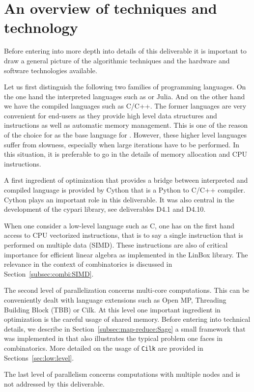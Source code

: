 \documentclass{deliverablereport}
\newcommand{\Cilk}{\texttt{Cilk}\xspace}
\begin{document}
\section{An overview of techniques and technology}

Before entering into more depth into details of this deliverable it is
important to draw a general picture of the algorithmic techniques
and the hardware and software technologies available.

Let us first distinguish the following two families of programming
languages. On the one hand the interpreted languages
such as \Python or Julia. And on the other hand we have the compiled languages
such as C/C++. The former languages are very convenient for end-users as
they provide high level data structures and instructions as well as automatic
memory management. This is one of the reason of the choice for \Python as the
base language for \Sage. However, these higher level languages suffer from slowness,
especially when large iterations have to be performed. In this situation, it is
preferable to go in the details of memory allocation and CPU instructions.

A first ingredient of optimization that provides a bridge between interpreted
and compiled language is provided by Cython that is a Python
to C/C++ compiler. Cython plays an important role in this deliverable. It
was also central in the development of the cypari library, see deliverables
D4.1 and D4.10.

When one consider a low-level language such as C, one has on the first hand
access to CPU vectorized instructions, that is to say a single instruction that
is performed on multiple data (SIMD). These
instructions are also of critical importance for efficient linear
algebra as implemented in the LinBox library. The relevance in the context
of combinatorics is discussed in Section~\ref{subsec:combi:SIMD}.

The second level of parallelization concerns multi-core computations. This can
be conveniently dealt with language extensions such as Open MP,
Threading Building Block (TBB) or Cilk. At this level one important
ingredient in optimization is the careful usage of shared memory.
Before entering into technical details, we describe in
Section~\ref{subsec:map-reduce:Sage} a small framework that was
implemented in \Sage that also illustrates the typical problem one faces
in combinatorics. More detailed on the usage of \Cilk are provided
in Sections~\ref{sec:low:level}.

The last level of parallelism concerns computations with multiple nodes
and is not addressed by this deliverable.
\end{document}
